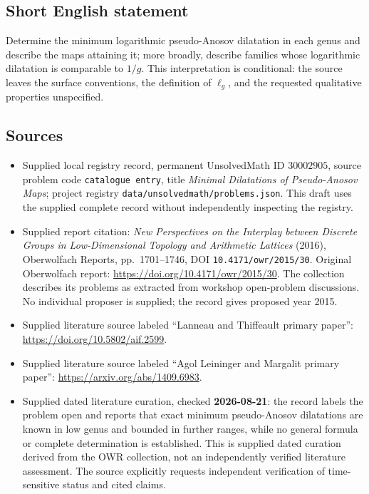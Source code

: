 \documentclass[11pt]{article}
\begin{document}
\subsection{Short English statement}
Determine the minimum logarithmic pseudo-Anosov dilatation in each genus and describe the maps attaining it; more broadly, describe families whose logarithmic dilatation is comparable to \(1/g\). This interpretation is conditional: the source leaves the surface conventions, the definition of \(\ell_g\), and the requested qualitative properties unspecified.
\subsection{Sources}
\begin{itemize}
\item Supplied local registry record, permanent UnsolvedMath ID \(30002905\), source problem code \texttt{catalogue entry}, title \emph{Minimal Dilatations of Pseudo-Anosov Maps}; project registry \texttt{data/unsolvedmath/problems.json}. This draft uses the supplied complete record without independently inspecting the registry.
\item Supplied report citation: \emph{New Perspectives on the Interplay between Discrete Groups in Low-Dimensional Topology and Arithmetic Lattices} (2016), Oberwolfach Reports, pp.\ 1701--1746, DOI \texttt{10.4171/owr/2015/30}. Original Oberwolfach report: \url{https://doi.org/10.4171/owr/2015/30}. The collection describes its problems as extracted from workshop open-problem discussions. No individual proposer is supplied; the record gives proposed year 2015.
\item Supplied literature source labeled ``Lanneau and Thiffeault primary paper'': \url{https://doi.org/10.5802/aif.2599}.
\item Supplied literature source labeled ``Agol Leininger and Margalit primary paper'': \url{https://arxiv.org/abs/1409.6983}.
\item Supplied dated literature curation, checked \textbf{2026-08-21}: the record labels the problem open and reports that exact minimum pseudo-Anosov dilatations are known in low genus and bounded in further ranges, while no general formula or complete determination is established. This is supplied dated curation derived from the OWR collection, not an independently verified literature assessment. The source explicitly requests independent verification of time-sensitive status and cited claims.
\end{itemize}
\end{document}
